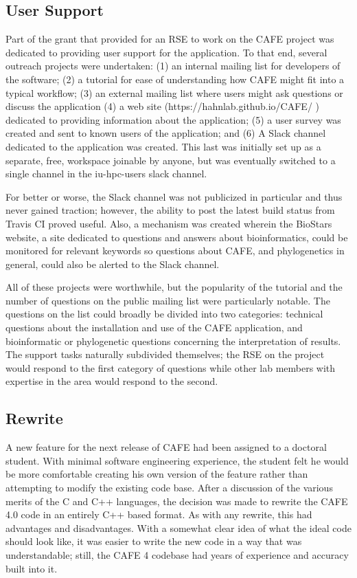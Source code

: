 \documentclass[acmtog, authorversion]{acmart}
\begin{document}
\subsection{User Support}
    Part of the grant that provided for an RSE to work on the CAFE project was dedicated to providing user support for the application. To that end, several outreach projects were undertaken: (1) an internal mailing list for developers of the software; (2) a tutorial for ease of understanding how CAFE might fit into a typical workflow; (3) an external mailing list where users might ask questions or discuss the application (4) a web site (https://hahnlab.github.io/CAFE/ ) dedicated to providing information about the application; (5) a user survey was created and sent to known users of the application; and (6) A Slack channel dedicated to the application was created. This last was initially set up as a separate, free, workspace joinable by anyone, but was eventually switched to a single channel in the iu-hpc-users slack channel. 
    
    For better or worse, the Slack channel was not publicized in particular and thus never gained traction; however, the ability to post the latest build status from Travis CI proved useful. Also, a mechanism was created wherein the BioStars website, a site dedicated to questions and answers about bioinformatics, could be monitored for relevant keywords so questions about CAFE, and phylogenetics in general, could also be alerted to the Slack channel. 
    
    All of these projects were worthwhile, but the popularity of the tutorial and the number of questions on the public mailing list were particularly notable. The questions on the list could broadly be divided into two categories: technical questions about the installation and use of the CAFE application, and bioinformatic or phylogenetic questions concerning the interpretation of results. The support tasks naturally subdivided themselves; the RSE on the project would respond to the first category of questions while other lab members with expertise in the area would respond to the second.

\subsection{Rewrite}
    A new feature for the next release of CAFE had been assigned to a doctoral student. With minimal software engineering experience, the student felt he would be more comfortable creating his own version of the feature rather than attempting to modify the existing code base. After a discussion of the various merits of the C and C++ languages, the decision was made to rewrite the CAFE 4.0 code in an entirely C++ based format. As with any rewrite, this had advantages and disadvantages. With a somewhat clear idea of what the ideal code should look like, it was easier to write the new code in a way that was understandable; still, the CAFE 4 codebase had years of experience and accuracy built into it. 
    
\end{document}
